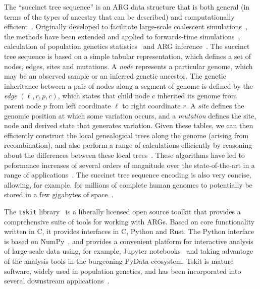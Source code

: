 \documentclass{article}
\begin{document}
The ``succinct tree sequence'' is an ARG data structure
that is both general (in terms of the types of ancestry that can
be described) and computationally efficient~\citep{Wong2023-efficient}.
Originally developed to facilitate large-scale coalescent
simulations~\citep{Kelleher2016-wk}, the methods have been
extended and applied to forwards-time
simulations~\citep{Kelleher2018-xc,Haller2018-tree},
calculation of population genetics statistics~\citep{Ralph2020-efficiently}
and ARG inference~\citep{Kelleher2019-ba,Wohns2022-th}.
The succinct tree sequence is based on a simple tabular representation,
which defines a set of nodes, edges, sites and mutations. A \emph{node}
represents a particular genome, which may be an observed sample
or an inferred genetic ancestor. The genetic inheritance between
a pair of nodes along a segment of genome is defined by
the \emph{edge} $(\ell, r, p, c)$, which states that
child node $c$ inherited its genome from parent node $p$
from left coordinate $\ell$ to right coordinate $r$. A \emph{site}
defines the genomic position at which some variation occurs,
and a \emph{mutation} defines the site, node and derived state
that generates variation.
Given these tables, we can then efficiently construct the local
genealogical trees along the genome (arising from recombination),
and also perform a range of calculations efficiently by
reasoning about the differences between these local
trees~\citep{Kelleher2016-wk,Ralph2020-efficiently}. These
algorithms have led to peformance increases of several orders
of magnitude over the state-of-the-art in a range of
applications~\citep{Kelleher2016-wk,Kelleher2018-xc,Kelleher2019-ba,
Ralph2020-efficiently,Baumdicker2022-ep}.
The succinct tree sequence encoding
is also very concise, allowing, for example, for millions of
complete human genomes to potentially be stored in a few gigabytes of
space~\citep{Kelleher2019-ba}.

The \texttt{tskit} library~\citep{Tskit2023-tskit} is a liberally
licensed open source toolkit that provides a comprehensive suite
of tools for working with ARGs. Based on core functionality written
in C, it provides interfaces in C, Python and Rust. The Python interface
is based on NumPy~\citep{Harris2020-array}, and provides a convenient
platform for interactive analysis of large-scale data using, for
example, Jupyter notebooks~\citep{Kluyver2016-jupyter} and taking
advantage of the analysis tools in the burgeoning PyData ecosystem.
Tskit is mature software, widely used in population genetics, and
has been incorporated into several downstream
applications~\citep[e.g.][]{Haller2019-slim,Speidel2019-yh,
Terasaki2021-geonomics,
Fan2022-genealogical,Korfmann2022-weak,
Mahmoudi2022-bayesian,Petr2022-slendr,Rasmussen2022-espalier}.
\end{document}
